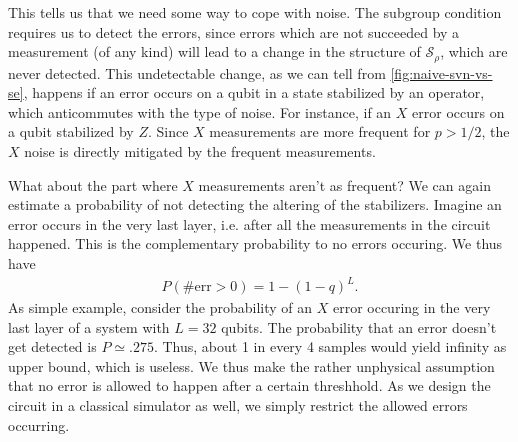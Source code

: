 This tells us that we need some way to cope with noise. The subgroup condition
requires us to detect the errors, since errors which are not succeeded by a
measurement (of any kind) will lead to a change in the structure of
$\mathcal{S}_\rho$, which are never detected. This undetectable change, as we
can tell from \cref{fig:naive-svn-vs-se}, happens if an error occurs on a qubit
in a state stabilized by an operator, which anticommutes with the type of
noise. For instance, if an $X$ error occurs on a qubit stabilized by $Z$. Since
$X$ measurements are more frequent for $p> 1/2$, the $X$ noise is directly
mitigated by the frequent measurements. 

What about the part where $X$ measurements aren't as frequent? We can again
estimate a probability of not detecting the altering of the stabilizers.
Imagine an error occurs in the very last layer, i.e. after all the measurements
in the circuit happened. This is the complementary probability to no errors
occuring. We thus have
\begin{align}
  P(\#\mathrm{err}>0) = 1-(1-q)^L
.\end{align}
As simple example, consider the probability of an $X$ error occuring in the
very last layer of a system with $L=32$ qubits. The probability that an error
doesn't get detected is $P\simeq\num{.275}$. Thus, about 1 in every 4 samples
would yield infinity as upper bound, which is useless. We thus make the rather
unphysical assumption that no error is allowed to happen after a certain
threshhold. As we design the circuit in a classical simulator as well, we
simply restrict the allowed errors occurring.

